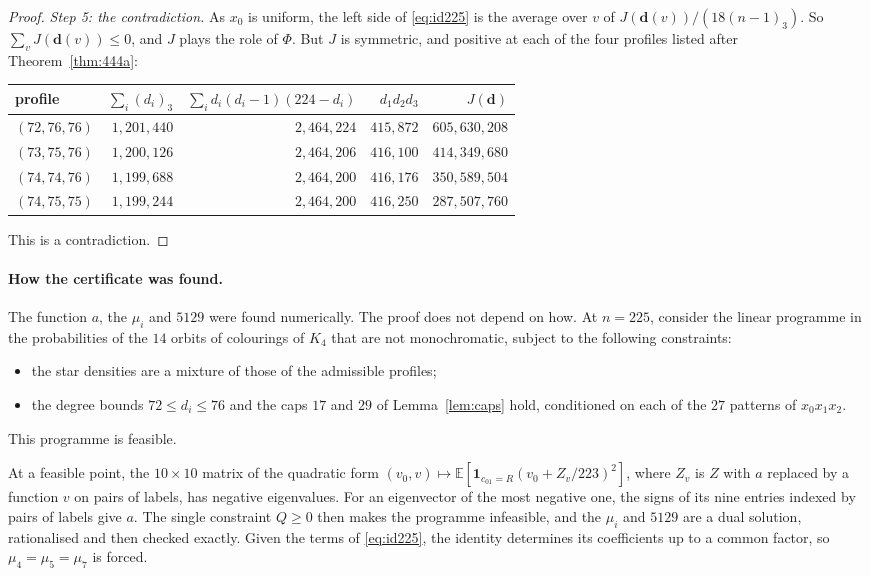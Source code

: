 \documentclass[11pt]{article}
\theoremstyle{spacedplain}
\theoremstyle{spaceddef}
\theoremstyle{spacedremark}
\begin{document}
\begin{proof}
\emph{Step 5: the contradiction.}
As $x_0$ is uniform, the left side of \eqref{eq:id225} is the average over $v$ of $J(\mathbf d(v))/(18(n-1)_3)$.
So $\sum_vJ(\mathbf d(v))\le 0$, and $J$ plays the role of $\Phi$.
But $J$ is symmetric, and positive at each of the four profiles listed after Theorem~\ref{thm:444a}:
\begin{center}\small
\begin{tabular}{lrrrr}
\toprule
profile & $\sum_i(d_i)_3$ & $\sum_id_i(d_i-1)(224-d_i)$ & $d_1d_2d_3$ & $J(\mathbf d)$\\
\midrule
$(72,76,76)$ & $1{,}201{,}440$ & $2{,}464{,}224$ & $415{,}872$ & $605{,}630{,}208$\\
$(73,75,76)$ & $1{,}200{,}126$ & $2{,}464{,}206$ & $416{,}100$ & $414{,}349{,}680$\\
$(74,74,76)$ & $1{,}199{,}688$ & $2{,}464{,}200$ & $416{,}176$ & $350{,}589{,}504$\\
$(74,75,75)$ & $1{,}199{,}244$ & $2{,}464{,}200$ & $416{,}250$ & $287{,}507{,}760$\\
\bottomrule
\end{tabular}
\end{center}
This is a contradiction.
\end{proof}

\paragraph{How the certificate was found.}
The function $a$, the $\mu_i$ and $5129$ were found numerically.
The proof does not depend on how.
At $n=225$, consider the linear programme in the probabilities of the $14$ orbits of colourings of $K_4$ that are not monochromatic, subject to the following constraints:
\begin{itemize}
\item the star densities are a mixture of those of the admissible profiles;
\item the degree bounds $72\le d_i\le 76$ and the caps $17$ and $29$ of Lemma~\ref{lem:caps} hold, conditioned on each of the $27$ patterns of $x_0x_1x_2$.
\end{itemize}
This programme is feasible.

At a feasible point, the $10\times 10$ matrix of the quadratic form $(v_0,v)\mapsto\mathbb E[\mathbf 1_{c_{01}=R}(v_0+Z_v/223)^2]$, where $Z_v$ is $Z$ with $a$ replaced by a function $v$ on pairs of labels, has negative eigenvalues.
For an eigenvector of the most negative one, the signs of its nine entries indexed by pairs of labels give $a$.
The single constraint $Q\ge 0$ then makes the programme infeasible, and the $\mu_i$ and $5129$ are a dual solution, rationalised and then checked exactly.
Given the terms of \eqref{eq:id225}, the identity determines its coefficients up to a common factor, so $\mu_4=\mu_5=\mu_7$ is forced.
\end{document}
